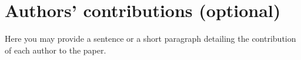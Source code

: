 \documentclass[charis,linguex]{glossa}
\begin{document}
\section*{Authors' contributions (optional)}

Here you may provide a sentence or a short paragraph detailing the contribution of each author to the paper.

\nocite{*} %

\end{document}

